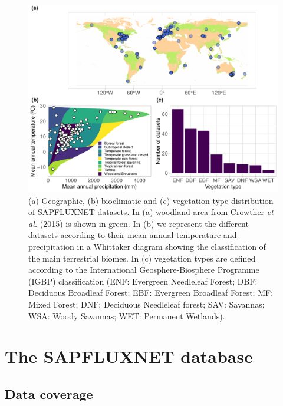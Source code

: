 \documentclass[11pt,twoside]{reedthesis}
\begin{document}
\setlength{\abovecaptionskip}{0pt}
\begin{figure}[H]

{\centering \includegraphics[width=1\linewidth]{figure/CH3/Figure2} 

}

\caption[Geographic, bioclimatic and vegetation type distribution of SAPFLUXNET datasets.]{(a) Geographic, (b) bioclimatic and (c) vegetation type
distribution of SAPFLUXNET datasets. In (a) woodland area from Crowther
\emph{et al.} (2015) is shown in green. In (b) we represent the
different datasets according to their mean annual temperature and
precipitation in a Whittaker diagram showing the classification of the
main terrestrial biomes. In (c) vegetation types are defined according
to the International Geosphere-Biosphere Programme (IGBP) classification
(ENF: Evergreen Needleleaf Forest; DBF: Deciduous Broadleaf Forest; EBF:
Evergreen Broadleaf Forest; MF: Mixed Forest; DNF: Deciduous Needleleaf
forest; SAV: Savannas; WSA: Woody Savannas; WET: Permanent Wetlands).}\label{fig:Ch2plot2}
\end{figure}
\section{The SAPFLUXNET database}\label{the-sapfluxnet-database}

\subsection{Data coverage}\label{data-coverage}
\end{document}
